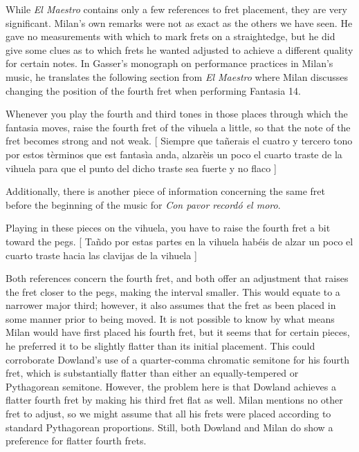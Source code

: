 While \textit{El Maestro} contains only a few references to fret placement, they are
very significant. Milan's own remarks were not as exact as the others we have
seen. He gave no measurements with which to mark frets on a straightedge, but he
did give some clues as to which frets he wanted adjusted to achieve a different
quality for certain notes. In Gasser's monograph on performance practices in Milan's
music, he translates the following section from \textit{El Maestro} where Milan
discusses changing the position of the fourth fret when performing Fantasia 14.
\begin{blocks}
Whenever you play the fourth and third tones in those places through which the fantasia
moves, raise the fourth fret of the vihuela a little, so that the note of the fret
becomes strong and not weak.
[ Siempre que ta\~{n}erais el cuatro y tercero tono por estos t\`{e}rminos que est
fantas\`{i}a anda, alzar\`{e}is un poco el cuarto traste de la vihuela para que el
punto del dicho traste sea fuerte y no flaco ]\autocite[156]{LG:1}
\end{blocks}
Additionally, there is another piece of information concerning the same fret before the
beginning of the music for \textit{Con pavor record\'{o} el moro}.
\begin{blocks}
Playing in these pieces on the vihuela, you have to raise the fourth fret a bit toward
the pegs.
[ Ta\~{n}do por estas partes en la vihuela hab\'{e}is de alzar un poco el
cuarto traste hacia las clavijas de la vihuela ]\autocite[156]{LG:1}
\end{blocks}
Both references concern the fourth fret, and both offer an adjustment that raises the
fret closer to the pegs, making the interval smaller. This would equate to a narrower
major third; however, it also assumes that the fret as been placed in some manner prior
to being moved. It is not possible to know by what means Milan would have first placed
his fourth fret, but it seems that for certain pieces, he preferred it
to be slightly flatter than its initial placement. This could corroborate Dowland's
use of a quarter-comma chromatic semitone for his fourth fret, which is substantially
flatter than either an equally-tempered or Pythagorean semitone. However, the problem
here is that Dowland achieves a flatter fourth fret by making his third fret flat
as well. Milan mentions no other fret to adjust, so we might assume that all his frets
were placed according to standard Pythagorean proportions. Still, both Dowland and
Milan do show a preference for flatter fourth frets.

